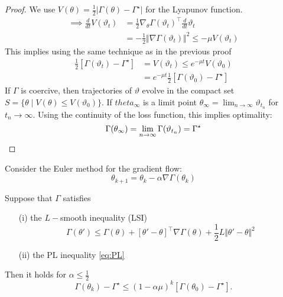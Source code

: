 \begin{proof}
    We use \(V(\theta)=\frac{1}{2}\vert \Gamma(\theta)-\Gamma^\star\vert\)
    for the Lyapunov function. 
    \begin{align*}
        \implies \frac{d}{dt}V(\vartheta_t)&=\frac{1}{2}\nabla_\theta\Gamma(\vartheta_t)^\intercal \frac{d}{dt}\vartheta_t\\
        &=-\frac{1}{2}\Vert \nabla\Gamma(\vartheta_t)\Vert^2\leq -\mu V(\vartheta_t)
    \end{align*}
    This implies using the same technique as in the previous proof
    \begin{align*}
        \frac{1}{2}\left[\Gamma(\vartheta_t)-\Gamma^\star\right]&=V(\vartheta_t)\leq e^{-\mu t}V(\vartheta_0)\\
        &= e^{-\mu t}\frac{1}{2}\left[\Gamma(\vartheta_0)-\Gamma^\star\right]
    \end{align*}
    If \(\Gamma\) is coercive, then trajectories of \(\vartheta\) evolve
    in the compact set \(S=\{\theta\mid V(\theta)\leq V(\vartheta_0)\}\). If 
    \(theta_\infty\) is a limit point \(\theta_\infty=\lim_{n\to\infty}\vartheta_{t_n}\)
    for \(t_n\to\infty\).
    Using the continuity of the loss function, this implies optimality:
    \[\Gamma(\theta_\infty)=\lim_{n\to\infty}\Gamma(\vartheta_{t_n})=\Gamma^\star\qedhere\] 
\end{proof}
Consider the Euler method for the gradient flow:
\begin{equation}\label{eq:euler-gradient-flow}
    \theta_{k+1}=\theta_k-\alpha \nabla\Gamma(\theta_k)
\end{equation}
\begin{theorem}\label{thm:32}
    Suppose that \(\Gamma\) satisfies
    \begin{enumerate}
        \item[(i)] the \(L-\)smooth inequality (LSI) \[\Gamma(\theta')\leq\Gamma(\theta)+[\theta'-\theta]^\intercal\nabla\Gamma(\theta)+\frac{1}{2}L\Vert \theta'-\theta\Vert^2\]
        \item[(ii)] the PL inequality \ref{eq:PL}  
    \end{enumerate}
    Then it holds for \(\alpha\leq \frac{1}{2}\)
    \[\Gamma(\theta_{k})-\Gamma^\star\leq (1-\alpha\mu)^k[\Gamma(\theta_0)-\Gamma^\star].\]
\end{theorem}

